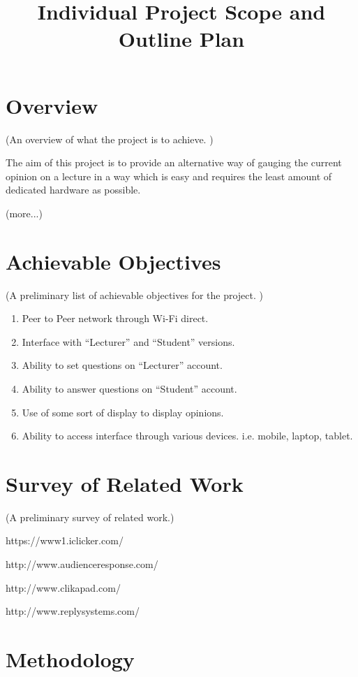 \documentclass{article}
\title{
\textmd{\textbf{Individual Project Scope and Outline Plan}}\\
}
\author{\textbf{\hmwkAuthorName}}
\begin{document}

\section{Overview}
(An overview of what the project is to achieve. )

The aim of this project is to provide an alternative way of gauging the current opinion on a lecture in a way which is easy and requires the least amount of dedicated hardware as possible. 

(more...)


\section{Achievable Objectives}
(A preliminary list of achievable objectives for the project. )

\begin{enumerate}
	\item Peer to Peer network through Wi-Fi direct.
	\item Interface with ``Lecturer'' and ``Student'' versions.
	\item Ability to set questions on ``Lecturer'' account.
	\item Ability to answer questions on ``Student'' account. 
	\item Use of some sort of display to display opinions.
	\item Ability to access interface through various devices. i.e. mobile, laptop, tablet.
\end{enumerate}

\section{Survey of Related Work}

(A preliminary survey of related work.)

https://www1.iclicker.com/

http://www.audienceresponse.com/

http://www.clikapad.com/

http://www.replysystems.com/

\section{Methodology}
\end{document}
